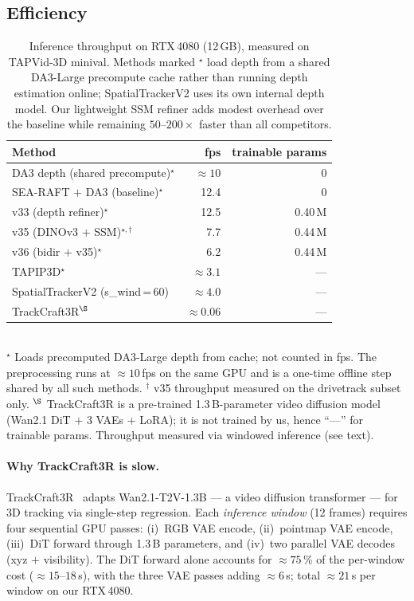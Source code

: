 \documentclass[11pt,a4paper]{article}
\begin{document}
\subsection{Efficiency}
\begin{table}[h]
\centering
\caption{Inference throughput on RTX\,4080 (12\,GB), measured on TAPVid-3D minival.
         Methods marked $^{\star}$ load depth from a shared DA3-Large precompute
         cache rather than running depth estimation online;
         SpatialTrackerV2 uses its own internal depth model.
         Our lightweight SSM refiner adds modest overhead over the baseline while
         remaining $50$--$200\times$ faster than all competitors.}
\label{tab:efficiency}
\begin{tabular}{lrr}
\toprule
Method & fps & trainable params \\
\midrule
DA3 depth (shared precompute)$^{\star}$ & ${\approx}10$ & 0 \\
\midrule
SEA-RAFT $+$ DA3 (baseline)$^{\star}$  & 12.4 & 0        \\
v33 (depth refiner)$^{\star}$          & 12.5 & 0.40\,M  \\
v35 (DINOv3 $+$ SSM)$^{\star,\dagger}$ & 7.7  & 0.44\,M  \\
v36 (bidir $+$ v35)$^{\star}$          & 6.2  & 0.44\,M  \\
\midrule
TAPIP3D$^{\star}$                      & ${\approx}3.1$  & --- \\
SpatialTrackerV2 (s\_wind\,=\,60)      & ${\approx}4.0$  & --- \\
TrackCraft3R$^{\S}$                    & ${\approx}0.06$ & --- \\
\bottomrule
\end{tabular}
\\[2pt]
{\footnotesize
$^{\star}$ Loads precomputed DA3-Large depth from cache; not counted in fps.
The preprocessing runs at ${\approx}10$\,fps on the same GPU and is a one-time
offline step shared by all such methods.
$^{\dagger}$ v35 throughput measured on the drivetrack subset only.
$^{\S}$ TrackCraft3R is a pre-trained 1.3\,B-parameter video diffusion model (Wan2.1
DiT $+$ 3 VAEs $+$ LoRA); it is not trained by us, hence ``---'' for trainable params.
Throughput measured via windowed inference (see text).}
\end{table}

\paragraph{Why TrackCraft3R is slow.}
TrackCraft3R~\cite{trackcraft3r} adapts Wan2.1-T2V-1.3B --- a video diffusion transformer ---
for 3D tracking via single-step regression.
Each \emph{inference window} (12 frames) requires four sequential GPU passes:
(i)~RGB VAE encode, (ii)~pointmap VAE encode, (iii)~DiT forward through 1.3\,B
parameters, and (iv)~two parallel VAE decodes (xyz $+$ visibility).
The DiT forward alone accounts for ${\approx}75$\,\% of the per-window cost (${\approx}15$--$18$\,s),
with the three VAE passes adding ${\approx}6$\,s; total ${\approx}21$\,s per window on our RTX\,4080.
\end{document}
